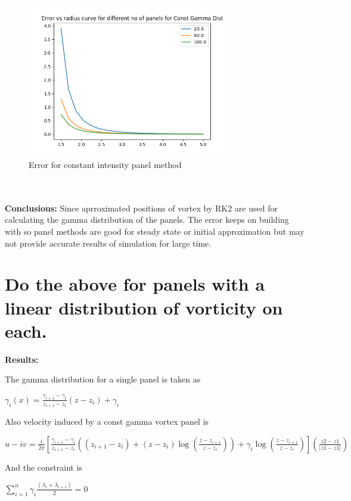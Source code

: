 \documentclass[a4paper,11pt]{article}
\begin{document}
	\begin{figure}[h]
		\centering
		\includegraphics[width = 0.8\textwidth]{q2const_error.png}
		\caption{Error for constant intensity panel method}
		\label{fig:2b}
	\end{figure}
	\newpage 
	\indent\\
	\newpage 
	\indent\\
	\indent \textbf{Conclusions:} Since aprroximated positions of vortex by RK2 are used for calculating the gamma distribution of the panels. The error keeps on building with so panel methods are good for steady state or initial approximation but may not provide accurate results of simulation for large time. 
	
	\newpage
	\section{Do the above for panels with a linear distribution of vorticity on each.}
	
	\textbf{Results:}
	
	The gamma distribution for a single panel is taken as \\
	\begin{center}
		$\gamma _i(x) = \frac{\gamma _{i+1} - \gamma _{i}}{z_{i+1} - z_i} (z - z_{i}) + \gamma _{i}$
	\end{center}
	
	Also velocity induced by a const gamma vortex panel is\\
	\begin{center}$ u - iv = \frac{i}{2\pi}[\frac{\gamma _{i+1} - \gamma _{i}}{z_{i+1} - z_{i}}((z_{i+1} - z_{i}) + (z - z_{i})\log(\frac{z - z_{i+1}}{z - z_{i}})) + \gamma _i\log(\frac{z - z_{i+1}}{z - z_{i}})](\frac{z2 - z1}{{|z1 - z1|}})$\\
		\end{center}
	\indent \indent And the constraint is \\
	\begin{center}
		$\sum_{i = 1}^{n} \gamma _i \frac{(\lambda _i + \lambda _{i+1})}{2} = 0$
	\end{center}
	
\end{document}
